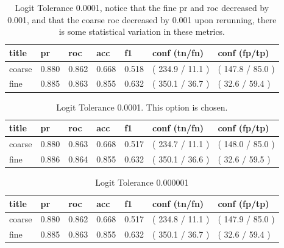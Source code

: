 \documentclass[ms]{nuthesis}
\begin{document}
\FloatBarrier
\begin{table}[H]
\centering
\caption{Logit Tolerance 0.0001, notice that the fine pr and roc decreased by 0.001, and that the
coarse roc decreased by 0.001 upon rerunning, there is some statistical variation in these metrics.}
\label{tab:LogRegOrig-0001}
\begin{tabular}{|l||l||l||l||l||l||l|}\toprule
title & pr & roc & acc & f1 & conf (tn/fn) & conf (fp/tp) \\ \midrule
coarse & 0.880 & 0.862 & 0.668 & 0.518 & ( 234.9 / 11.1 ) & ( 147.8 / 85.0 ) \\
fine & 0.885 & 0.863 & 0.855 & 0.632 & ( 350.1 / 36.7 ) & ( 32.6 / 59.4 ) \\ \bottomrule
\end{tabular}
\end{table}
\FloatBarrier




\FloatBarrier
\begin{table}[h]
\centering
\caption{Logit Tolerance 0.0001. This option is chosen.}
\label{tab:LogReg-00001Redo}
\begin{tabular}{|l||l||l||l||l||l||l|}\toprule
title & pr & roc & acc & f1 & conf (tn/fn) & conf (fp/tp) \\ \midrule
coarse & 0.880 & 0.863 & 0.668 & 0.517 & ( 234.7 / 11.1 ) & ( 148.0 / 85.0 ) \\
fine & 0.886 & 0.864 & 0.855 & 0.632 & ( 350.1 / 36.6 ) & ( 32.6 / 59.5 ) \\ \bottomrule
\end{tabular}
\end{table}
\FloatBarrier



\FloatBarrier
\begin{table}[H]
\centering
\caption{Logit Tolerance 0.000001}
\label{tab:LogReg-000001}
\begin{tabular}{|l||l||l||l||l||l||l|}\toprule
title & pr & roc & acc & f1 & conf (tn/fn) & conf (fp/tp) \\ \midrule
coarse & 0.880 & 0.862 & 0.668 & 0.517 & ( 234.8 / 11.1 ) & ( 147.9 / 85.0 ) \\
fine & 0.885 & 0.863 & 0.855 & 0.632 & ( 350.1 / 36.7 ) & ( 32.6 / 59.4 ) \\ \bottomrule
\end{tabular}
\end{table}
\FloatBarrier
\end{document}
